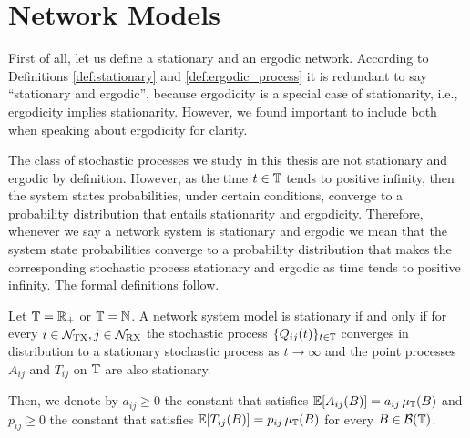 

\section{Network Models} \label{sec:poisson_network}

First of all, let us define a stationary and an ergodic network.
%
According to Definitions \ref{def:stationary} and \ref{def:ergodic_process} it is redundant to say ``stationary and ergodic'', because ergodicity is a special case of stationarity, i.e., ergodicity implies stationarity.
%
However, we found important to include both when speaking about ergodicity for clarity.

The class of stochastic processes we study in this thesis are not stationary and ergodic by definition. However, as the time $t\in{\mathbb T}$ tends to positive infinity, then the system states probabilities, under certain conditions, converge to a probability distribution that entails stationarity and ergodicity.
%
Therefore, whenever we say a network system is stationary and ergodic we mean that the system state probabilities converge to a probability distribution that makes the corresponding stochastic process stationary and ergodic as time tends to positive infinity.
%
The formal definitions follow.

\begin{definition}
    Let ${\mathbb T}={\mathbb R}_+$ or ${\mathbb T}={\mathbb N}$. A network system model is stationary if and only if for every $i\in\mathcal N_{\mathrm{TX}}, j\in\mathcal N_{\mathrm{RX}}$ the stochastic process $\{Q_{ij}(t)\}_{t\in{\mathbb T}}$ converges in distribution to a stationary stochastic process as $t\to\infty$ and the point processes $A_{ij}$ and $T_{ij}$ on ${\mathbb T}$ are also stationary.
    
    Then, we denote by $a_{ij} \ge 0$ the constant that satisfies ${\mathbb E}[A_{ij}(B)] = a_{ij} \,\mu_{\mathbb T}(B)$ and $p_{ij} \ge 0$ the constant that satisfies ${\mathbb E}[T_{ij}(B)] = p_{ij} \,\mu_{\mathbb T}(B)$ for every $B\in\mathcal{B}({\mathbb T})$.
\end{definition}

